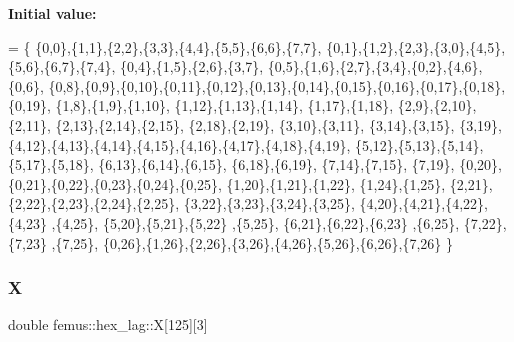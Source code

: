 {\bfseries Initial value\+:}
\begin{DoxyCode}
= \{
    \{0,0\},\{1,1\},\{2,2\},\{3,3\},\{4,4\},\{5,5\},\{6,6\},\{7,7\},
    \{0,1\},\{1,2\},\{2,3\},\{3,0\},\{4,5\},\{5,6\},\{6,7\},\{7,4\},
    \{0,4\},\{1,5\},\{2,6\},\{3,7\},
    \{0,5\},\{1,6\},\{2,7\},\{3,4\},\{0,2\},\{4,6\},\{0,6\},
    \{0,8\},\{0,9\},\{0,10\},\{0,11\},\{0,12\},\{0,13\},\{0,14\},\{0,15\},\{0,16\},\{0,17\},\{0,18\},\{0,19\}, 
    \{1,8\},\{1,9\},\{1,10\},       \{1,12\},\{1,13\},\{1,14\},              \{1,17\},\{1,18\},        
      \{2,9\},\{2,10\},\{2,11\},       \{2,13\},\{2,14\},\{2,15\},              \{2,18\},\{2,19\}, 
        \{3,10\},\{3,11\},              \{3,14\},\{3,15\},                     \{3,19\}, 
                  \{4,12\},\{4,13\},\{4,14\},\{4,15\},\{4,16\},\{4,17\},\{4,18\},\{4,19\}, 
                  \{5,12\},\{5,13\},\{5,14\},              \{5,17\},\{5,18\},        
                      \{6,13\},\{6,14\},\{6,15\},              \{6,18\},\{6,19\}, 
                         \{7,14\},\{7,15\},                     \{7,19\}, 
                         \{0,20\},\{0,21\},\{0,22\},\{0,23\},\{0,24\},\{0,25\}, 
                         \{1,20\},\{1,21\},\{1,22\},       \{1,24\},\{1,25\}, 
                                \{2,21\},\{2,22\},\{2,23\},\{2,24\},\{2,25\}, 
                                       \{3,22\},\{3,23\},\{3,24\},\{3,25\}, 
                         \{4,20\},\{4,21\},\{4,22\},\{4,23\}       ,\{4,25\}, 
                         \{5,20\},\{5,21\},\{5,22\}              ,\{5,25\}, 
                                \{6,21\},\{6,22\},\{6,23\}       ,\{6,25\}, 
                                       \{7,22\},\{7,23\}       ,\{7,25\}, 
                         \{0,26\},\{1,26\},\{2,26\},\{3,26\},\{4,26\},\{5,26\},\{6,26\},\{7,26\} 
  \}
\end{DoxyCode}
\mbox{\label{classfemus_1_1hex__lag_aa4f8a9df2fcb0a6f0ca0f0381868f8c7}} 
\subsubsection{\texorpdfstring{X}{X}}
{\footnotesize\ttfamily double femus\+::hex\+\_\+lag\+::X\mbox{[}125\mbox{]}\mbox{[}3\mbox{]}\hspace{0.3cm}{\ttfamily [protected]}}

\mbox{\label{classfemus_1_1hex__lag_a09e66c005d5c3e270006ef1694667f2f}} 
